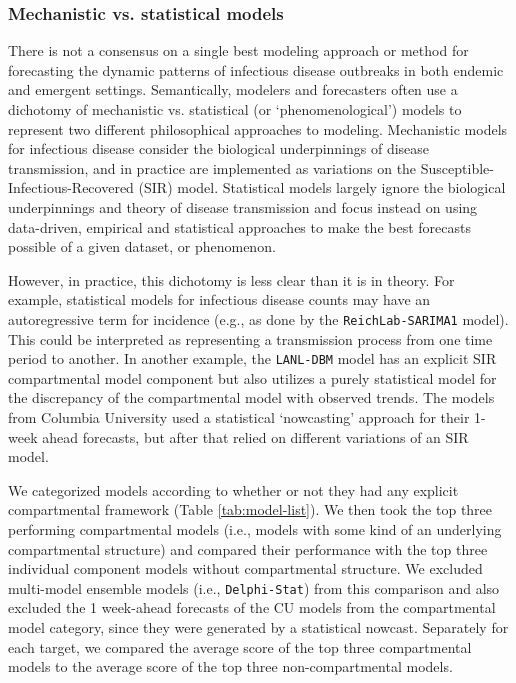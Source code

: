 \documentclass[9pt,twocolumn,twoside]{pnas-new}\usepackage[]{graphicx}\usepackage[]{color}
\begin{document}
{\subsubsection*{Mechanistic vs. statistical models}

There is not a consensus on a single best modeling approach or method for forecasting the dynamic patterns of infectious disease outbreaks in both endemic and emergent settings. 
Semantically, modelers and forecasters often use a dichotomy of mechanistic vs. statistical (or `phenomenological') models to represent two different philosophical approaches to modeling.
Mechanistic models for infectious disease consider the biological underpinnings of disease transmission, and in practice are implemented as variations on the Susceptible-Infectious-Recovered (SIR) model. 
Statistical models largely ignore the biological underpinnings and theory of disease transmission and focus instead on using data-driven, empirical and statistical approaches to make the best forecasts possible of a given dataset, or phenomenon. 

However, in practice, this dichotomy is less clear than it is in theory.
For example, statistical models for infectious disease counts may have an autoregressive term for incidence (e.g., as done by the {\tt ReichLab-SARIMA1} model).
This could be interpreted as representing a transmission process from one time period to another.
In another example, the {\tt LANL-DBM} model has an explicit SIR compartmental model component but also utilizes a purely statistical model for the discrepancy of the compartmental model with observed trends.
The models from Columbia University used a statistical `nowcasting' approach for their 1-week ahead forecasts, but after that relied on different variations of an SIR model.

We categorized models according to whether or not they had any explicit compartmental framework (Table \ref{tab:model-list}). 
We then took the top three performing compartmental models (i.e., models with some kind of an underlying compartmental structure) and compared their performance with the top three individual component models without compartmental structure. 
We excluded multi-model ensemble models (i.e., {\tt Delphi-Stat}) from this comparison and also excluded the 1 week-ahead forecasts of the CU models from the compartmental model category, since they were generated by a statistical nowcast.
Separately for each target, we compared the average score of the top three compartmental models to the average score of the top three non-compartmental models.

}
\end{document}
